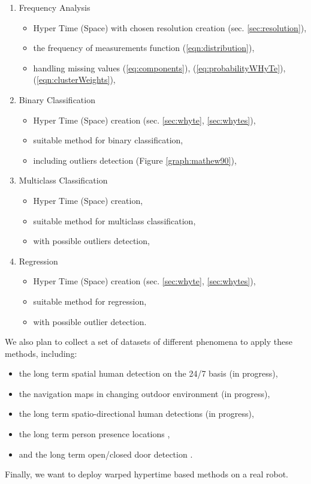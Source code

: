 \begin{enumerate}
    \item Frequency Analysis
    \begin{itemize}
        \item Hyper Time (Space) with chosen resolution creation (sec. \ref{sec:resolution}),
        \item the frequency of measurements function (\ref{eqn:distribution}),
        \item handling missing values (\ref{eq:components}), (\ref{eq:probabilityWHyTe}), (\ref{eqn:clusterWeights}),
    \end{itemize}
    \item Binary Classification
    \begin{itemize}
        \item Hyper Time (Space) creation (sec. \ref{sec:whyte}, \ref{sec:whytes}),
        \item suitable method for binary classification,
        \item including outliers detection \cite{Vintr2018Spatiotemporal} (Figure \ref{graph:mathew90}),
    \end{itemize}
    \item Multiclass Classification
    \begin{itemize}
        \item Hyper Time (Space) creation,
        \item suitable method for multiclass classification,
        \item with possible outliers detection,
    \end{itemize}
    \item Regression
    \begin{itemize}
        \item Hyper Time (Space) creation (sec. \ref{sec:whyte}, \ref{sec:whytes}),
        \item suitable method for regression,
        \item with possible outlier detection.
    \end{itemize}
\end{enumerate}

We also plan to collect a set of datasets of different phenomena to apply these methods, including:
\begin{itemize}
    \item the long term spatial human detection on the 24/7 basis (in progress),
    \item the navigation maps in changing outdoor environment (in progress),
    \item the long term spatio-directional human detections (in progress),
    \item the long term person presence locations \cite{krajnik2015s},
    \item and the long term open/closed door detection \cite{krajnik2014long}.
\end{itemize} 
    
Finally, we want to deploy warped hypertime based methods on a real robot.
        

